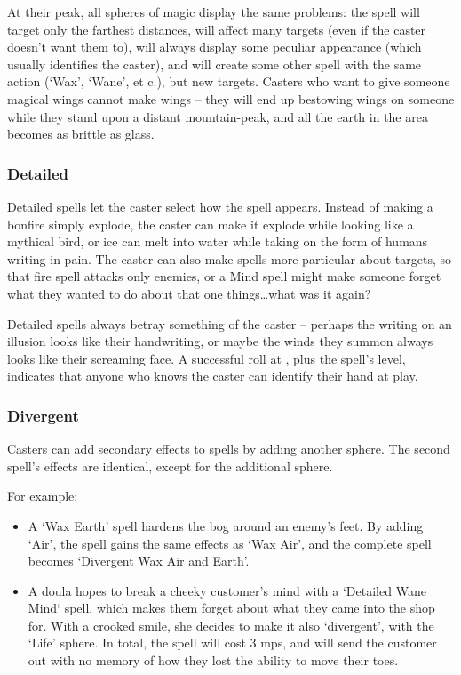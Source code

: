 \begin{multicols}{2}
At their peak, all spheres of magic display the same problems: the spell will target only the farthest distances, will affect many targets (even if the caster doesn't want them to), will always display some peculiar appearance (which usually identifies the caster), and will create some other spell with the same action (`Wax', `Wane', et c.), but new targets.
Casters who want to give someone magical wings cannot make wings -- they will end up bestowing wings on someone while they stand upon a distant mountain-peak, and all the earth in the area becomes as brittle as glass.

\subsubsection{Detailed}

Detailed spells let the caster select how the spell appears.
Instead of making a bonfire simply explode, the caster can make it explode while looking like a mythical bird, or ice can melt into water while taking on the form of humans writing in pain.
The caster can also make spells more particular about targets, so that fire spell attacks only enemies, or a Mind spell might make someone forget what they wanted to do about that one things\ldots what was it again?

Detailed spells always betray something of the caster -- perhaps the writing on an illusion looks like their handwriting, or maybe the winds they summon always looks like their screaming face.
A successful  roll at \tn[7], plus the spell's level, indicates that anyone who knows the caster can identify their hand at play.

\subsubsection{Divergent}

Casters can add secondary effects to spells by adding another sphere.
The second spell's effects are identical, except for the additional sphere.

For example:

\begin{itemize}
  \item
  A `Wax Earth' spell hardens the bog around an enemy's feet.
  By adding `Air', the spell gains the same effects as `Wax Air', and the complete spell becomes `Divergent Wax Air and Earth'.
  \item
  A doula hopes to break a cheeky customer's mind with a `Detailed Wane Mind` spell, which makes them forget about what they came into the shop for.
  With a crooked smile, she decides to make it also `divergent', with the `Life' sphere.
  In total, the spell will cost 3 \glspl{mp}, and will send the customer out with no memory of how they lost the ability to move their toes.
\end{itemize}


\end{multicols}
